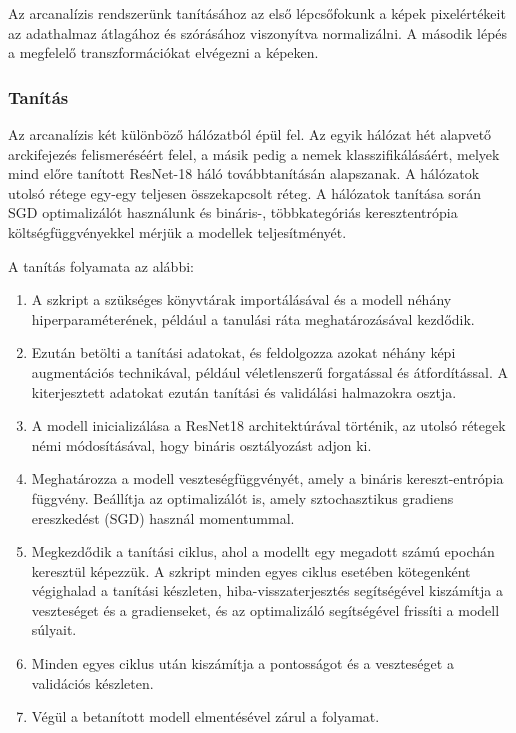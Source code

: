 \documentclass[12pt,a4]{article}
\begin{document}
                Az arcanalízis rendszerünk tanításához az első lépcsőfokunk a képek pixelértékeit az adathalmaz átlagához és szórásához viszonyítva normalizálni. A második lépés a megfelelő transzformációkat elvégezni a képeken.

            \subsubsection{Tanítás}
                
                    Az arcanalízis két különböző hálózatból épül fel. Az egyik hálózat hét alapvető arckifejezés felismeréséért felel, a másik pedig a nemek klasszifikálásáért,
                    melyek mind előre tanított ResNet-18 háló továbbtanításán alapszanak.
                    A hálózatok utolsó rétege egy-egy teljesen összekapcsolt réteg.
                    A hálózatok tanítása során SGD optimalizálót használunk és bináris-, többkategóriás keresztentrópia költségfüggvényekkel mérjük a modellek teljesítményét.

                    A tanítás folyamata az alábbi: 
                        \begin{enumerate}
                            \item A szkript a szükséges könyvtárak importálásával és a modell néhány hiperparaméterének, például a tanulási ráta meghatározásával kezdődik.

                            \item Ezután betölti a tanítási adatokat, és feldolgozza azokat néhány képi augmentációs technikával, például véletlenszerű forgatással és átfordítással. A kiterjesztett adatokat ezután tanítási és validálási halmazokra osztja.

                            \item A modell inicializálása a ResNet18 architektúrával történik, az utolsó rétegek némi módosításával, hogy bináris osztályozást adjon ki. 

                            \item Meghatározza a modell veszteségfüggvényét, amely a bináris kereszt-entrópia függvény. Beállítja az optimalizálót is, amely sztochasztikus gradiens ereszkedést (SGD) használ momentummal.

                            \item Megkezdődik a tanítási ciklus, ahol a modellt egy megadott számú epochán keresztül képezzük. A szkript minden egyes ciklus esetében kötegenként végighalad a tanítási készleten, hiba-visszaterjesztés segítségével kiszámítja a veszteséget és a gradienseket, és az optimalizáló segítségével frissíti a modell súlyait.

                            \item Minden egyes ciklus után kiszámítja a pontosságot és a veszteséget a validációs készleten.

                            \item Végül a betanított modell elmentésével zárul a folyamat.
                        \end{enumerate}\\
\end{document}
